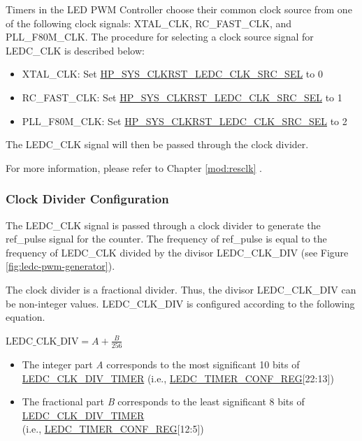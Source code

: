 \documentclass[main\_\_EN.tex]{subfiles}
\begin{document}
Timers in the LED PWM Controller choose their common clock source from one of the following clock signals: XTAL\_CLK, RC\_FAST\_CLK, and PLL\_F80M\_CLK. The procedure for selecting a clock source signal for LEDC\_CLK is described below:

\begin{itemize}
    \item XTAL\_CLK: Set \hyperref[fielddesc:HPSYSCLKRSTLEDCCLKSRCSEL]{HP\_SYS\_CLKRST\_LEDC\_CLK\_SRC\_SEL} to 0
    \item RC\_FAST\_CLK: Set \hyperref[fielddesc:HPSYSCLKRSTLEDCCLKSRCSEL]{HP\_SYS\_CLKRST\_LEDC\_CLK\_SRC\_SEL} to 1
    \item PLL\_F80M\_CLK: Set \hyperref[fielddesc:HPSYSCLKRSTLEDCCLKSRCSEL]{HP\_SYS\_CLKRST\_LEDC\_CLK\_SRC\_SEL} to 2
\end{itemize}

The LEDC\_CLK signal will then be passed through the clock divider.

For more information, please refer to Chapter \ref{mod:resclk} \textit{}.

\subsubsection{Clock Divider Configuration}

The LEDC\_CLK signal is passed through a clock divider to generate the ref\_pulse signal for the counter. The frequency of ref\_pulse is equal to the frequency of LEDC\_CLK divided by the divisor LEDC\_CLK\_DIV (see Figure \ref{fig:ledc-pwm-generator}).

The clock divider is a fractional divider. Thus, the divisor LEDC\_CLK\_DIV can be non-integer values. LEDC\_CLK\_DIV is configured according to the following equation.

\begin{center}
$\textrm{LEDC\_CLK\_DIV} = A + \frac{B}{256}$
\end{center}

\begin{itemize}
    \item The integer part \textit{A} corresponds to the most significant 10 bits of \hyperref[fielddesc:LEDCCLKDIVTIMERN]{LEDC\_CLK\_DIV\_TIMER} (i.e., \hyperref[regdesc:LEDCTIMERNCONFREG]{LEDC\_TIMER\_CONF\_REG}[22:13])
    \item The fractional part \textit{B} corresponds to the least significant 8 bits of \hyperref[fielddesc:LEDCCLKDIVTIMERN]{LEDC\_CLK\_DIV\_TIMER} \\(i.e., \hyperref[regdesc:LEDCTIMERNCONFREG]{LEDC\_TIMER\_CONF\_REG}[12:5])
\end{itemize}
\end{document}
